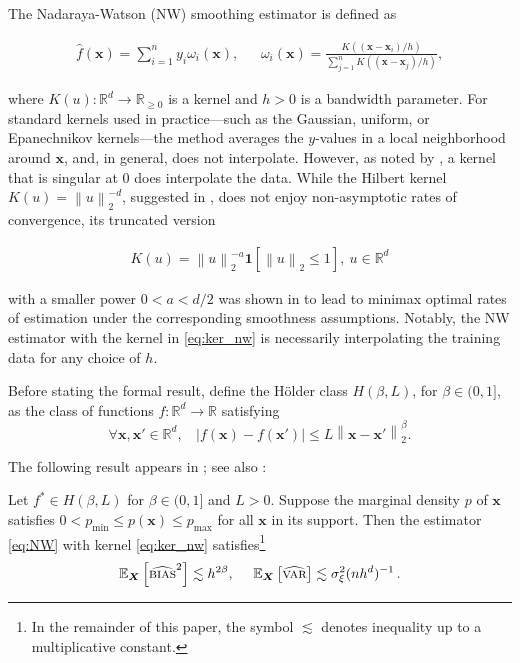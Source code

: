 The Nadaraya-Watson (NW) smoothing estimator \cite{nadaraya1964estimating,watson1964smooth} is defined as

\begin{align}
	\label{eq:NW}
	\widehat{f}({\boldsymbol x}) = \sum_{i=1}^n y_i \omega_i({\boldsymbol x}),~~~~~~~ \omega_i({\boldsymbol x}) = \frac{K(({\boldsymbol x}-{\boldsymbol x}_i)/h)}{\sum_{j=1}^n K(({\boldsymbol x}-{\boldsymbol x}_j)/h)},
\end{align}

	
where $K(u):{\mathbb R}^d\to{\mathbb R}_{\geq 0}$ is a kernel and $h> 0$ is a bandwidth parameter. For standard kernels used in practice---such as the Gaussian, uniform, or Epanechnikov kernels---the method averages the $y$-values in a local neighborhood around ${\boldsymbol x}$, and, in general, does not interpolate. However, as noted by \cite{devroye1998hilbert}, a kernel that is singular at $0$ does interpolate the data. While the Hilbert kernel $K(u)=\left\|u\right\|_2^{-d}$, suggested in \cite{devroye1998hilbert}, does not enjoy non-asymptotic rates of convergence, its truncated version

\begin{align}
	\label{eq:ker_nw}
	K(u) = \left\|u\right\|^{-a}_2 \ensuremath{\boldsymbol{1}\left[\left\|u\right\|_2\leq 1\right]},~ u\in{\mathbb R}^d
\end{align}

 with a smaller power $0<a<d/2$ was shown in \cite{belkin2019does} to lead to minimax optimal rates of estimation under the corresponding smoothness assumptions. Notably, the NW estimator with the kernel in \eqref{eq:ker_nw} is necessarily interpolating the training data for any choice of $h$.

Before stating the formal result, define the H\"older class $H(\beta,L)$, for $\beta\in(0,1]$, as the class of functions $f:{\mathbb R}^d\to {\mathbb R}$ satisfying
$$\forall {\boldsymbol x},{\boldsymbol x}'\in{\mathbb R}^d,~~~~ |f({\boldsymbol x})-f({\boldsymbol x}')|\leq L\left\|{\boldsymbol x}-{\boldsymbol x}'\right\|_2^\beta.$$

The following result appears in \cite{belkin2019does}; see also \cite{belkin2018overfitting}:

\begin{theorem}
	\label{thm:NW}
	Let $f^*\in H(\beta,L)$ for $\beta\in(0,1]$ and $L>0$. Suppose the marginal density $p$ of ${\boldsymbol x}$ satisfies $0<p_{\text{min}}\leq p({\boldsymbol x}) \leq p_{\text{max}}$ for all ${\boldsymbol x}$ in its support. Then the estimator \eqref{eq:NW} with kernel \eqref{eq:ker_nw} satisfies\footnote{In the remainder of this paper, the symbol $\lesssim$ denotes inequality up to a multiplicative constant.}
		\begin{align}
			\mathbb{E}_{{\boldsymbol X}} \left[{\widehat{\textsc{bias}}^2}\right] \lesssim
            h^{2\beta},~~~~\mathbb{E}_{{\boldsymbol X}} \left[{\widehat{\textsc{var}}}\right]
            \lesssim \sigma^2_\xi (nh^d)^{-1} \, .
		\end{align}

\end{theorem}


